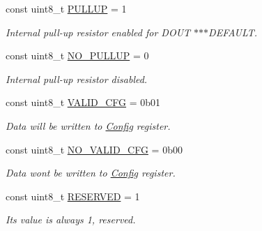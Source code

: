 \begin{DoxyCompactItemize}
const uint8\+\_\+t \mbox{\hyperlink{class_a_d_s1118_ab5035f17d58adff567e8002d3e5c40fa}{P\+U\+L\+L\+UP}} = 1
\begin{DoxyCompactList}\small\item\em Internal pull-\/up resistor enabled for D\+O\+UT $\ast$$\ast$$\ast$\+D\+E\+F\+A\+U\+LT. \end{DoxyCompactList}\item 
\mbox{\label{class_a_d_s1118_a9c4404b5040ec1b5f43094961e2f62d5}} 
const uint8\+\_\+t \mbox{\hyperlink{class_a_d_s1118_a9c4404b5040ec1b5f43094961e2f62d5}{N\+O\+\_\+\+P\+U\+L\+L\+UP}} = 0
\begin{DoxyCompactList}\small\item\em Internal pull-\/up resistor disabled. \end{DoxyCompactList}\item 
\mbox{\label{class_a_d_s1118_afc7ff1f66a8cda9826daeaf3fe5ba6ab}} 
const uint8\+\_\+t \mbox{\hyperlink{class_a_d_s1118_afc7ff1f66a8cda9826daeaf3fe5ba6ab}{V\+A\+L\+I\+D\+\_\+\+C\+FG}} = 0b01
\begin{DoxyCompactList}\small\item\em Data will be written to \mbox{\hyperlink{union_config}{Config}} register. \end{DoxyCompactList}\item 
\mbox{\label{class_a_d_s1118_aca0198f642c007b7ae32728ecc7b4b1f}} 
const uint8\+\_\+t \mbox{\hyperlink{class_a_d_s1118_aca0198f642c007b7ae32728ecc7b4b1f}{N\+O\+\_\+\+V\+A\+L\+I\+D\+\_\+\+C\+FG}} = 0b00
\begin{DoxyCompactList}\small\item\em Data won\textquotesingle{}t be written to \mbox{\hyperlink{union_config}{Config}} register. \end{DoxyCompactList}\item 
\mbox{\label{class_a_d_s1118_addf0469ded07f0cf2c7566745a9bf197}} 
const uint8\+\_\+t \mbox{\hyperlink{class_a_d_s1118_addf0469ded07f0cf2c7566745a9bf197}{R\+E\+S\+E\+R\+V\+ED}} = 1
\begin{DoxyCompactList}\small\item\em Its value is always 1, reserved. \end{DoxyCompactList}\item 
\mbox{\label{class_a_d_s1118_afc58ecaefacef5592c90c4c843d81dde}} 

\end{DoxyCompactItemize}
